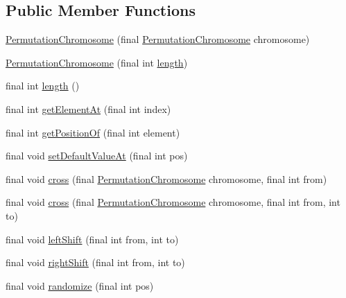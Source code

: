 \subsection*{Public Member Functions}
\begin{DoxyCompactItemize}
\item 
\hyperlink{classjenes_1_1chromosome_1_1_permutation_chromosome_a10cdd7769af8702d9b367b1a7a17214d}{Permutation\-Chromosome} (final \hyperlink{classjenes_1_1chromosome_1_1_permutation_chromosome}{Permutation\-Chromosome} chromosome)
\item 
\hyperlink{classjenes_1_1chromosome_1_1_permutation_chromosome_a7c3b4e904d419c51af512f1f82faa109}{Permutation\-Chromosome} (final int \hyperlink{classjenes_1_1chromosome_1_1_permutation_chromosome_abbdf232b2c833492472f1c487c23fadd}{length})
\item 
final int \hyperlink{classjenes_1_1chromosome_1_1_permutation_chromosome_abbdf232b2c833492472f1c487c23fadd}{length} ()
\item 
final int \hyperlink{classjenes_1_1chromosome_1_1_permutation_chromosome_a8c2aee80f46c4634d6797a346a6560cc}{get\-Element\-At} (final int index)
\item 
final int \hyperlink{classjenes_1_1chromosome_1_1_permutation_chromosome_a0c8a75c9417def5db8724d22aadf0303}{get\-Position\-Of} (final int element)
\item 
final void \hyperlink{classjenes_1_1chromosome_1_1_permutation_chromosome_a10210f11733f4d94e2743112179a2bf6}{set\-Default\-Value\-At} (final int pos)
\item 
final void \hyperlink{classjenes_1_1chromosome_1_1_permutation_chromosome_a3fda59734f77c447518e49086f7be0c2}{cross} (final \hyperlink{classjenes_1_1chromosome_1_1_permutation_chromosome}{Permutation\-Chromosome} chromosome, final int from)
\item 
final void \hyperlink{classjenes_1_1chromosome_1_1_permutation_chromosome_a19caa5ba36809bcbca85c990741731cb}{cross} (final \hyperlink{classjenes_1_1chromosome_1_1_permutation_chromosome}{Permutation\-Chromosome} chromosome, final int from, int to)
\item 
final void \hyperlink{classjenes_1_1chromosome_1_1_permutation_chromosome_a722e6ef2208337802c0a229b77a56629}{left\-Shift} (final int from, int to)
\item 
final void \hyperlink{classjenes_1_1chromosome_1_1_permutation_chromosome_afc488bdb0b77b15da659cde89a4e08b7}{right\-Shift} (final int from, int to)
\item 
final void \hyperlink{classjenes_1_1chromosome_1_1_permutation_chromosome_aea4acb031fb2b00f579be5c448825c47}{randomize} (final int pos)

\end{DoxyCompactItemize}
